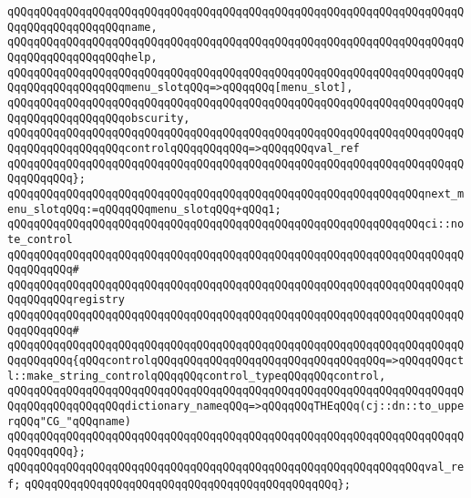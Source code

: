 \verb|qQQqqQQqqQQqqQQqqQQqqQQqqQQqqQQqqQQqqQQqqQQqqQQqqQQqqQQqqQQqqQQqqQQqqQQqqQQqqQQqqQQqqQQqname,|\newline
\verb|qQQqqQQqqQQqqQQqqQQqqQQqqQQqqQQqqQQqqQQqqQQqqQQqqQQqqQQqqQQqqQQqqQQqqQQqqQQqqQQqqQQqqQQqhelp,|\newline
\verb|qQQqqQQqqQQqqQQqqQQqqQQqqQQqqQQqqQQqqQQqqQQqqQQqqQQqqQQqqQQqqQQqqQQqqQQqqQQqqQQqqQQqqQQqmenu_slotqQQq=>qQQqqQQq[menu_slot],|\newline
\verb|qQQqqQQqqQQqqQQqqQQqqQQqqQQqqQQqqQQqqQQqqQQqqQQqqQQqqQQqqQQqqQQqqQQqqQQqqQQqqQQqqQQqqQQqobscurity,|\newline
\verb|qQQqqQQqqQQqqQQqqQQqqQQqqQQqqQQqqQQqqQQqqQQqqQQqqQQqqQQqqQQqqQQqqQQqqQQqqQQqqQQqqQQqqQQqcontrolqQQqqQQqqQQq=>qQQqqQQqval_ref|\newline
\verb|qQQqqQQqqQQqqQQqqQQqqQQqqQQqqQQqqQQqqQQqqQQqqQQqqQQqqQQqqQQqqQQqqQQqqQQqqQQqqQQq};|\newline
\newline
\verb|qQQqqQQqqQQqqQQqqQQqqQQqqQQqqQQqqQQqqQQqqQQqqQQqqQQqqQQqqQQqqQQqnext_menu_slotqQQq:=qQQqqQQqmenu_slotqQQq+qQQq1;|\newline
\newline
\verb|qQQqqQQqqQQqqQQqqQQqqQQqqQQqqQQqqQQqqQQqqQQqqQQqqQQqqQQqqQQqqQQqci::note_control|\newline
\verb|qQQqqQQqqQQqqQQqqQQqqQQqqQQqqQQqqQQqqQQqqQQqqQQqqQQqqQQqqQQqqQQqqQQqqQQqqQQqqQQq#|\newline
\verb|qQQqqQQqqQQqqQQqqQQqqQQqqQQqqQQqqQQqqQQqqQQqqQQqqQQqqQQqqQQqqQQqqQQqqQQqqQQqqQQqregistry|\newline
\verb|qQQqqQQqqQQqqQQqqQQqqQQqqQQqqQQqqQQqqQQqqQQqqQQqqQQqqQQqqQQqqQQqqQQqqQQqqQQqqQQq#|\newline
\verb|qQQqqQQqqQQqqQQqqQQqqQQqqQQqqQQqqQQqqQQqqQQqqQQqqQQqqQQqqQQqqQQqqQQqqQQqqQQqqQQq{qQQqcontrolqQQqqQQqqQQqqQQqqQQqqQQqqQQqqQQqqQQq=>qQQqqQQqctl::make_string_controlqQQqqQQqcontrol_typeqQQqqQQqcontrol,|\newline
\verb|qQQqqQQqqQQqqQQqqQQqqQQqqQQqqQQqqQQqqQQqqQQqqQQqqQQqqQQqqQQqqQQqqQQqqQQqqQQqqQQqqQQqqQQqdictionary_nameqQQq=>qQQqqQQqTHEqQQq(cj::dn::to_upperqQQq"CG_"qQQqname)|\newline
\verb|qQQqqQQqqQQqqQQqqQQqqQQqqQQqqQQqqQQqqQQqqQQqqQQqqQQqqQQqqQQqqQQqqQQqqQQqqQQqqQQq};|\newline
\newline
\verb|qQQqqQQqqQQqqQQqqQQqqQQqqQQqqQQqqQQqqQQqqQQqqQQqqQQqqQQqqQQqqQQqval_ref;|\newline
\verb|qQQqqQQqqQQqqQQqqQQqqQQqqQQqqQQqqQQqqQQqqQQqqQQq};|\newline
